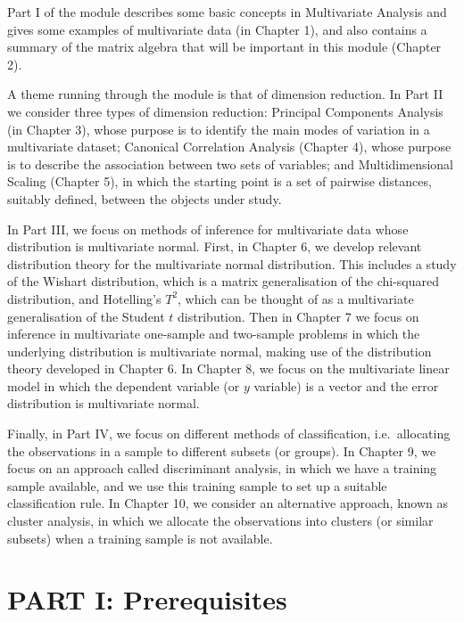 \documentclass[]{book}
\theoremstyle{definition}
\theoremstyle{definition}
\theoremstyle{definition}
\theoremstyle{remark}
\begin{document}
Part I of the module describes some basic concepts in Multivariate Analysis and gives some examples of multivariate data (in Chapter 1), and also contains a summary of the matrix algebra that will be important in this module (Chapter 2).

A theme running through the module is that of dimension reduction. In Part II we consider three types of dimension reduction: Principal Components Analysis (in Chapter 3),
whose purpose is to identify the main modes of variation in a multivariate dataset; Canonical Correlation Analysis (Chapter 4), whose purpose is to describe the association between two sets of variables; and Multidimensional Scaling (Chapter 5), in which the starting point is a set of pairwise distances, suitably defined, between the objects under study.

In Part III, we focus on methods of inference for multivariate data whose distribution is multivariate normal. First, in Chapter 6, we develop relevant distribution theory for the multivariate normal distribution. This includes a study of the Wishart distribution, which is a matrix generalisation of the chi-squared distribution, and Hotelling's \(T^2\), which can be thought of as a multivariate generalisation of the Student \(t\) distribution. Then in Chapter 7 we focus on inference in multivariate one-sample and two-sample problems in which the underlying distribution is multivariate normal, making use of the distribution theory developed in Chapter 6. In Chapter 8, we focus on the multivariate linear model in which the dependent variable (or \(y\) variable) is a vector and the error distribution is multivariate normal.

Finally, in Part IV, we focus on different methods of classification, i.e.~allocating the observations in a sample to different subsets (or groups). In Chapter 9, we focus on an approach called discriminant analysis, in which we have a training sample available, and we use this training sample to set up a suitable classification rule. In Chapter 10, we consider an alternative approach, known as cluster analysis, in which we allocate the observations into clusters (or similar subsets) when a training sample is not available.

\hypertarget{part-i-prerequisites}{%
\chapter*{PART I: Prerequisites}\label{part-i-prerequisites}}
\end{document}

